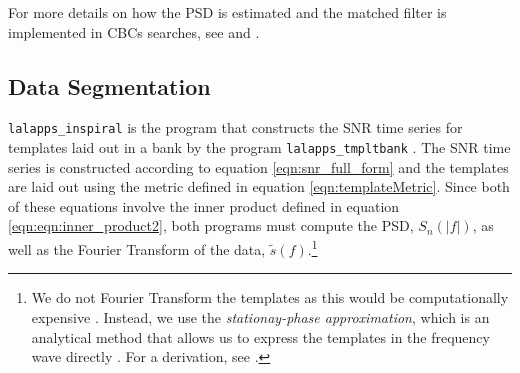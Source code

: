 For more details on how the \ac{PSD} is estimated and the matched filter is
implemented in \acp{CBC} searches, see \cite{Brown} and \cite{Allen:2005fk}.

\subsection{Data Segmentation}
\label{sec:data_segmentation}

\texttt{lalapps\_inspiral} is the program that constructs the \ac{SNR} time
series for templates laid out in a bank by the program
\texttt{lalapps\_tmpltbank} \cite{brown-2005-22}. The \ac{SNR} time series is
constructed according to equation \ref{eqn:snr_full_form} and the templates are
laid out using the metric defined in equation \ref{eqn:templateMetric}. Since
both of these equations involve the inner product defined in equation
\ref{eqn:eqn:inner_product2}, both programs must compute the \ac{PSD},
$S_n(|f|)$, as well as the Fourier Transform of the data,
$\widetilde{s}(f)$.\footnote{We do not Fourier Transform the templates as this
would be computationally expensive \cite{Brown}. Instead, we use the
\emph{stationay-phase approximation}, which is an analytical method that allows
us to express the templates in the frequency wave directly
\cite{WillWiseman:1996, Cutler:1994}. For a derivation, see \cite{Brown}.}

